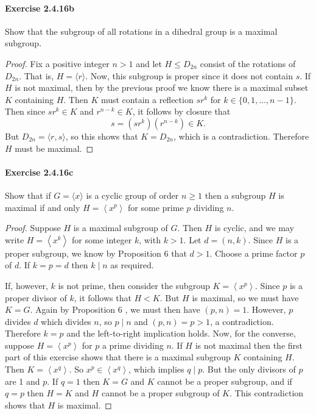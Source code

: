 \documentclass{article}
\theoremstyle{definition}
\begin{document}
\paragraph{Exercise 2.4.16b} Show that the subgroup of all rotations in a dihedral group is a maximal subgroup.
\begin{proof}
    Fix a positive integer $n>1$ and let $H \leq D_{2 n}$ consist of the rotations of $D_{2 n}$. That is, $H=\langle r\rangle$. Now, this subgroup is proper since it does not contain $s$. If $H$ is not maximal, then by the previous proof we know there is a maximal subset $K$ containing $H$. Then $K$ must contain a reflection $s r^k$ for $k \in\{0,1, \ldots, n-1\}$. Then since $s r^k \in K$ and $r^{n-k} \in K$, it follows by closure that
$$
s=\left(s r^k\right)\left(r^{n-k}\right) \in K .
$$
But $D_{2 n}=\langle r, s\rangle$, so this shows that $K=D_{2 n}$, which is a contradiction. Therefore $H$ must be maximal.
\end{proof}



\paragraph{Exercise 2.4.16c} Show that if $G=\langle x\rangle$ is a cyclic group of order $n \geq 1$ then a subgroup $H$ is maximal if and only $H=\left\langle x^{p}\right\rangle$ for some prime $p$ dividing $n$.
\begin{proof}
    Suppose $H$ is a maximal subgroup of $G$. Then $H$ is cyclic, and we may write $H=\left\langle x^k\right\rangle$ for some integer $k$, with $k>1$. Let $d=(n, k)$. Since $H$ is a proper subgroup, we know by Proposition 6 that $d>1$. Choose a prime factor $p$ of $d$. If $k=p=d$ then $k \mid n$ as required.

If, however, $k$ is not prime, then consider the subgroup $K=\left\langle x^p\right\rangle$. Since $p$ is a proper divisor of $k$, it follows that $H<K$. But $H$ is maximal, so we must have $K=G$. Again by Proposition 6 , we must then have $(p, n)=1$. However, $p$ divides $d$ which divides $n$, so $p \mid n$ and $(p, n)=p>1$, a contradiction. Therefore $k=p$ and the left-to-right implication holds.
Now, for the converse, suppose $H=\left\langle x^p\right\rangle$ for $p$ a prime dividing $n$. If $H$ is not maximal then the first part of this exercise shows that there is a maximal subgroup $K$ containing $H$. Then $K=\left\langle x^q\right\rangle$. So $x^p \in\left\langle x^q\right\rangle$, which implies $q \mid p$. But the only divisors of $p$ are 1 and $p$. If $q=1$ then $K=G$ and $K$ cannot be a proper subgroup, and if $q=p$ then $H=K$ and $H$ cannot be a proper subgroup of $K$. This contradiction shows that $H$ is maximal.
\end{proof}
\end{document}
